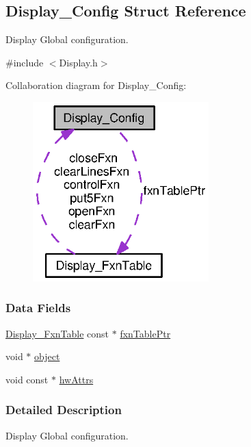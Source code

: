 \subsection{Display\+\_\+\+Config Struct Reference}
\label{struct_display___config}


Display Global configuration.  




{\ttfamily \#include $<$Display.\+h$>$}



Collaboration diagram for Display\+\_\+\+Config\+:
\nopagebreak
\begin{figure}[H]
\begin{center}
\leavevmode
\includegraphics[width=193pt]{struct_display___config__coll__graph}
\end{center}
\end{figure}
\subsubsection*{Data Fields}
\begin{DoxyCompactItemize}
\item 
\hyperlink{struct_display___fxn_table}{Display\+\_\+\+Fxn\+Table} const $\ast$ \hyperlink{struct_display___config_adce10e2738107a8b017ac8df3dbe1d73}{fxn\+Table\+Ptr}
\item 
void $\ast$ \hyperlink{struct_display___config_a3888ffcab482aacee937ec782f49110d}{object}
\item 
void const $\ast$ \hyperlink{struct_display___config_a5fe62abb9c875eca79144e916082ecb8}{hw\+Attrs}
\end{DoxyCompactItemize}


\subsubsection{Detailed Description}
Display Global configuration. 

